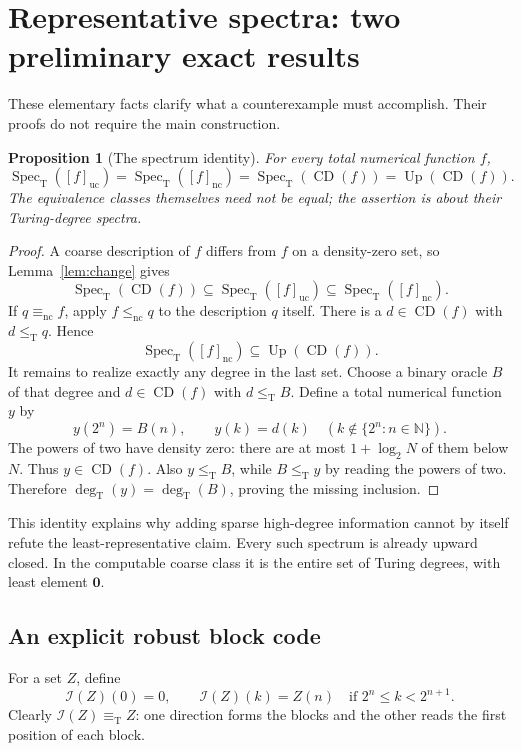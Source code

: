\documentclass[11pt,a4paper]{article}
\newcommand{\N}{\mathbb N}
\newcommand{\leT}{\leq_{\mathrm T}}
\newcommand{\eqT}{\equiv_{\mathrm T}}
\newcommand{\degT}{\operatorname{deg}_{\mathrm T}}
\newcommand{\CD}{\operatorname{CD}}
\newcommand{\Spec}{\operatorname{Spec}_{\mathrm T}}
\newcommand{\Up}{\operatorname{Up}}
\newcommand{\nc}{\mathrm{nc}}
\newcommand{\uc}{\mathrm{uc}}
\newcommand{\Icode}{\mathcal I}
\newtheorem{proposition}[theorem]{Proposition}
\theoremstyle{definition}
\theoremstyle{remark}
\begin{document}
\section{Representative spectra: two preliminary exact results}\label{sec:spectra}
These elementary facts clarify what a counterexample must accomplish. Their proofs do not require the main construction.

\begin{proposition}[The spectrum identity]\label{prop:spectrum}
For every total numerical function $f$,
\begin{equation}\label{eq:spectrum}
\Spec([f]_{\uc})
=\Spec([f]_{\nc})
=\Spec(\CD(f))
=\Up(\CD(f)).
\end{equation}
The equivalence classes themselves need not be equal; the assertion is about their Turing-degree spectra.
\end{proposition}
\begin{proof}
A coarse description of $f$ differs from $f$ on a density-zero set, so Lemma~\ref{lem:change} gives
\[
\Spec(\CD(f))\subseteq\Spec([f]_{\uc})\subseteq\Spec([f]_{\nc}).
\]
If $q\equiv_{\nc}f$, apply $f\leq_{\nc}q$ to the description $q$ itself. There is a $d\in\CD(f)$ with $d\leT q$. Hence
\[
\Spec([f]_{\nc})\subseteq\Up(\CD(f)).
\]
It remains to realize exactly any degree in the last set. Choose a binary oracle $B$ of that degree and $d\in\CD(f)$ with $d\leT B$. Define a total numerical function $y$ by
\[
y(2^n)=B(n),\qquad y(k)=d(k)\quad(k\notin\{2^n:n\in\N\}).
\]
The powers of two have density zero: there are at most $1+\log_2N$ of them below $N$. Thus $y\in\CD(f)$. Also $y\leT B$, while $B\leT y$ by reading the powers of two. Therefore $\degT(y)=\degT(B)$, proving the missing inclusion.
\end{proof}

This identity explains why adding sparse high-degree information cannot by itself refute the least-representative claim. Every such spectrum is already upward closed. In the computable coarse class it is the entire set of Turing degrees, with least element $\mathbf0$.

\subsection{An explicit robust block code}
For a set $Z$, define
\begin{equation}\label{eq:block-code}
\Icode(Z)(0)=0,\qquad
\Icode(Z)(k)=Z(n)\quad\text{if }2^n\leq k<2^{n+1}.
\end{equation}
Clearly $\Icode(Z)\eqT Z$: one direction forms the blocks and the other reads the first position of each block.
\end{document}
